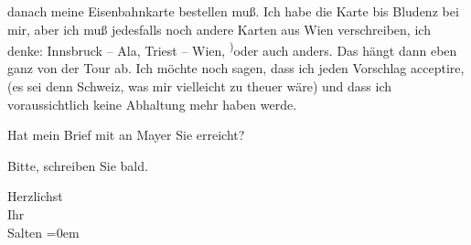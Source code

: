                danach meine Eisenbahnkarte bestellen muß. Ich habe die Karte bis Bludenz bei mir, aber ich muß jedesfalls noch andere Karten
               aus Wien verschreiben, ich denke: \strikeout{(}Innsbruck – Ala, Triest – Wien, \substVorne{}\textsuperscript{)}\substDazwischen{}o\substHinten{}der auch anders. Das hängt dann eben ganz von der Tour ab. {\pb}Ich möchte noch sagen, dass ich
               jeden Vorschlag acceptire, (es sei denn Schweiz, was mir vielleicht zu theuer wäre) und dass ich voraussichtlich keine
               Abhaltung mehr haben werde.\pend
           
\pstart
           Hat mein Brief mit
               \label{K_L03310-2v}\label{K_L03310-2} an Mayer Sie erreicht?\pend
           
\pstart
           Bitte, schreiben Sie bald.\pend
           
\pstart
           Herzlichst {\\[\baselineskip]}Ihr {\\[\baselineskip]}\spacefill\mbox{Salten}\pend
           \leftskip=0em{}\endnumbering{}  
      